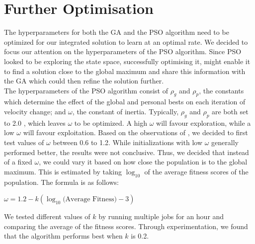 \documentclass[12pt]{article}
\begin{document}
	\vspace{-0.3cm}
	\section{Further Optimisation}
	\vspace{-0.2cm}
	The hyperparameters for both the GA and the PSO algorithm need
	to be optimized for our integrated solution to learn at an optimal rate.
	We decided to focus our attention on the hyperparameters
	of the PSO algorithm. Since PSO looked to be exploring the state space, successfully
	optimising it, might enable it to find a solution close to the global
	maximum and share this information with the GA which could then refine the solution further.\\

	The hyperparameters of the PSO algorithm consist of $\rho_g$ and $\rho_p$, the constants
	which determine the effect of the global and personal bests on each iteration
	of velocity change; and $\omega$, the constant of inertia. Typically, $\rho_g$ and $\rho_p$ are both
	set to 2.0 \cite{alam2015comparative}, which leaves $\omega$ to be optimized. A high $\omega$ will favour exploration,
	while a low $\omega$ will favour exploitation. Based on the observations of
	\cite{shi1998parameter}, we decided to first test values of $\omega$ between 0.6 to 1.2.
	While initializations with low $\omega$ generally performed better, the results were
	not conclusive. Thus, we decided that instead of a fixed $\omega$, we could vary it
	based on how close the population is to the global maximum. This is estimated
	by taking $\log_{10}$ of the average fitness scores of the population. The formula is as follows:

	\begin{center}
		$\omega = 1.2 - k(\log_{10}\text{(Average Fitness)} - 3)$
	\end{center}

	We tested different values of $k$ by running multiple jobs for an hour and comparing
 	the average of the fitness scores. Through experimentation, we found that the
	algorithm performs best when $k$ is 0.2.\\


\end{document}
